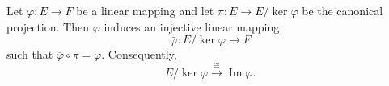 Let $\varphi: E \to F$ be a linear mapping and let $\pi: E \to E/\ker \varphi$ be the canonical projection. Then $\varphi$ induces an injective linear mapping
$$
\bar{\varphi}: E/\ker \varphi \to F
$$
such that $\bar{\varphi} \circ \pi = \varphi$. Consequently,
$$
E/\ker \varphi \xrightarrow{\cong} \operatorname{Im} \varphi.
$$
